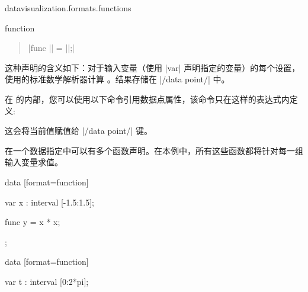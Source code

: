 \begin{tikzlibrary}{datavisualization.formats.functions}
\begin{dataformat}{function}
\begin{quote}
            |func || = ||;|
        \end{quote}
        这种声明的含义如下：对于输入变量（使用 |var| 声明指定的变量）的每个设置，使用\tikzname 的标准数学解析器计算 。结果存储在 |/data point/| 中。


        在  的内部，您可以使用以下命令引用数据点属性，该命令只在这样的表达式内定义:
        \begin{command}{\value{}} %

            这会将当前值赋值给 |/data point/| 键。
        \end{command}


        在一个数据指定中可以有多个函数声明。在本例中，所有这些函数都将针对每一组输入变量求值。
\begin{codeexample}[preamble={\usetikzlibrary{datavisualization.formats.functions}}]
\tikz
    data [format=function] {
      var x : interval [-1.5:1.5];

      func y = \value x * \value x;
    };
\end{codeexample}
\begin{codeexample}[
    width=6cm,
    preamble={\usetikzlibrary{datavisualization.formats.functions}},
]
\tikz \datavisualization [
  school book axes,
  all axes={unit length=5mm, ticks={step=2}},
  visualize as smooth line]
data [format=function] {
  var t : interval [0:2*pi];

}
\end{codeexample}
\end{dataformat}
\end{tikzlibrary}
